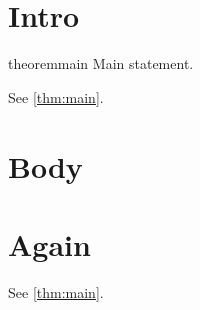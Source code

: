 \documentclass{article}
\begin{document}
\section{Intro}
\begin{restatable*}{theorem}{main}\label{thm:main}
Main statement.
\end{restatable*}
See \ref{thm:main}.
\section{Body}
\main
\section{Again}
\main
See \ref{thm:main}.
\end{document}
